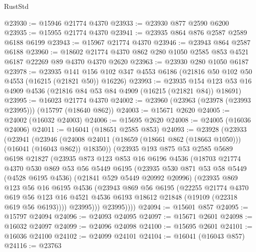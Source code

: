 \begin{lexlean}{RustStd}
\begin{coremodule}
@23930 := @15946 @21774 @4370
@23933 := @23930 @877 @2590 @6200
@23935 := @15955 @21774 @4370
@23941 := @23935 @864 @876 @2587 @2589 @6188 @6199
@23943 := @15967 @21774 @4370
@23946 := @23943 @864 @2587 @6188
@23960 := @18602 @21774 @4370 @862 @280 @1050 @2585 @853 @4521 @6187 @22269 @89 @4370 @4370 @2620
@23963 := @23930 @280 @1050 @6187
@23978 := @23935
    @141
    @156
    @102
    @347
    @4553
    @6186
    (@21816 @50 @102 @50 @4553 (@16215 (@21821 @50)) @16226)
@23993 := @23935
    @154
    @123
    @53
    @16
    @4909
    @4536
    (@21816 @84 @53 @84 @4909 (@16215 (@21821 @84)) @18691)
@23995 := @16023 @21774 @4370
@24002 := @23960 (@23963 (@23978 (@23993 @23995))) (@15797 (@18640 @862))
@24003 := @15671 @2620
@24005 := @24002 (@16032 @24003)
@24006 := @15695 @2620
@24008 := @24005 (@16036 @24006)
@24011 := @16041 (@18651 @2585 @853)
@24093 := @23928
    (@23933
      (@23941
        (@23946 (@24008 @24011 (@18659 (@18661 @862 (@18663 @1050))) (@16041 (@16043 @862)) @18350))
        (@23935
          @193
          @875
          @53
          @2585
          @5689
          @6198
          @21827
          (@23935
            @873
            @123
            @853
            @16
            @6196
            @4536
            (@18703
              @21774
              @4370
              @530
              @869
              @53
              @56
              @5449
              @6195
              (@23935
                @530
                @871
                @53
                @58
                @5449
                (@4528 @6195 @4536)
                (@21841 @529 @5449 @20992 @20996)
                (@23935
                  @869
                  @123
                  @56
                  @16
                  @6195
                  @4536
                  (@23943
                    @869
                    @56
                    @6195
                    (@22255
                      @21774
                      @4370
                      @619
                      @56
                      @123
                      @16
                      @4521
                      @4536
                      @6193
                      @18612
                      @21848
                      (@19109 (@22318 @619 @56 @6193))))
                  @23995)))
            @23995))))
@24094 := @15601 @857
@24095 := @15797 @24094
@24096 := @24093 @24095
@24097 := @15671 @2601
@24098 := @16032 @24097
@24099 := @24096 @24098
@24100 := @15695 @2601
@24101 := @16036 @24100
@24102 := @24099 @24101
@24104 := @16041 (@16043 @857)
@24116 := @23763

\end{coremodule}
\end{lexlean}
